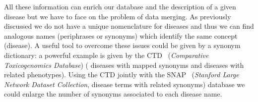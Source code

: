 \documentclass{standalone}
\begin{document}
All these information can enrich our database and the description of a given disease but we have to face on the problem of data merging.
As previously discussed we do not have a unique nomenclature for diseases and thus we can find analogous names (periphrases or synonyms) which identify the same concept (disease).
A useful tool to overcome these issues could be given by a synonym dictionary: a powerful example is given by the CTD~\cite{CTDdb} (\emph{Comparative Toxicogenomics Database}) ( diseases with mapped synonyms and  diseases with related phenotypes).
Using the CTD jointly with the SNAP~\cite{biosnapnets} (\emph{Stanford Large Network Dataset Collection},  disease terms with related synonyms) database we could enlarge the number of synonyms associated to each disease name.
\end{document}
